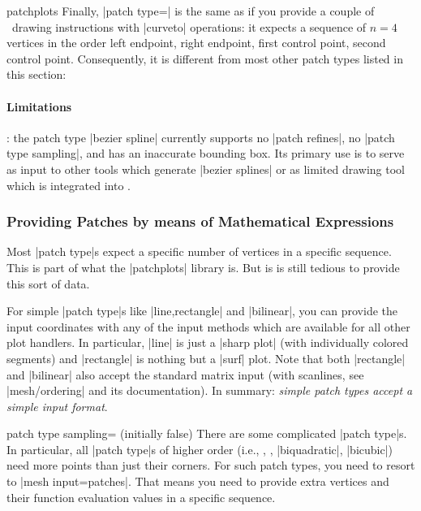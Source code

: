 {\begin{pgfplotslibrary}{patchplots}
Finally, |patch type=| is the same as if you provide a couple of \Tikz\ drawing instructions with |curveto| operations: it expects a sequence of $n=4$ vertices in the order left endpoint, right endpoint, first control point, second control point. Consequently, it is different from most other patch types listed in this section:

\begin{codeexample}[]
\end{codeexample}
\paragraph{Limitations}: the patch type |bezier spline| currently supports no |patch refines|, no |patch type sampling|, and has an inaccurate bounding box. Its primary use is to serve as input to other tools which generate |bezier splines| or as limited drawing tool which is integrated into \PGFPlots.

\subsubsection{Providing Patches by means of Mathematical Expressions}

Most |patch type|s expect a specific number of vertices in a specific sequence.
This is part of what the |patchplots| library is. But is is still tedious to
provide this sort of data.

For simple |patch type|s like |line,rectangle| and |bilinear|, you can provide
the input coordinates with any of the input methods which are available for all
other plot handlers. In particular, |line| is just a |sharp plot| (with
individually colored segments) and |rectangle| is nothing but a |surf| plot.
Note that both |rectangle| and |bilinear| also accept the standard matrix input
(with scanlines, see |mesh/ordering| and its documentation). In summary:
\emph{simple patch types accept a simple input format}.


\begin{pgfplotskey}{patch type sampling= (initially false)}
    There are some complicated |patch type|s. In particular, all |patch type|s
    of higher order (i.e.\@ {},
    , , |biquadratic|,
    |bicubic|) need more points than just their corners. For such patch types,
    you need to resort to |mesh input=patches|. That means you need to provide
    extra vertices and their function evaluation values in a specific sequence.


\end{pgfplotskey}
\end{pgfplotslibrary}}
